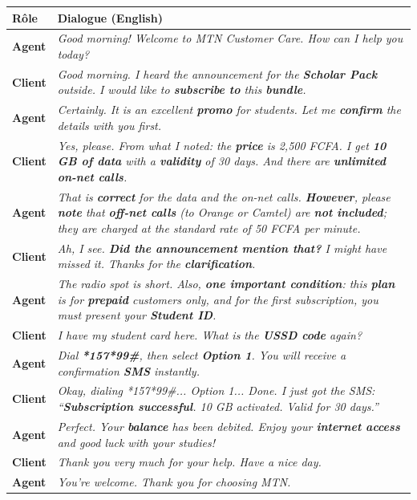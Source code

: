 \documentclass[11pt]{article}
\newcommand{\eng}[1]{\ifmmode\text{\textit{#1}}\else\begingroup\selectlanguage{english}\itshape #1\endgroup\fi}
\begin{document}
\begin{exoresolu}[Modèle de dialogue — Scénario 1 : MTN Scholar Pack (Élève A = Client / Élève B = Agent)]
\begin{tabularx}{\linewidth}{|l|X|}\hline
\rowcolor{popblueL} \textbf{Rôle} & \textbf{Dialogue (English)} \\ \hline
\textbf{Agent} & \eng{Good morning! Welcome to MTN Customer Care. How can I help you today?} \\ \hline
\textbf{Client} & \eng{Good morning. I heard the announcement for the \textbf{Scholar Pack} outside. I would like to \textbf{subscribe to} this \textbf{bundle}.} \\ \hline
\textbf{Agent} & \eng{Certainly. It is an excellent \textbf{promo} for students. Let me \textbf{confirm} the details with you first.} \\ \hline
\textbf{Client} & \eng{Yes, please. From what I noted: the \textbf{price} is 2,500 FCFA. I get \textbf{10 GB of data} with a \textbf{validity} of 30 days. And there are \textbf{unlimited on-net calls}.} \\ \hline
\textbf{Agent} & \eng{That is \textbf{correct} for the data and the on-net calls. \textbf{However}, please \textbf{note} that \textbf{off-net calls} (to Orange or Camtel) are \textbf{not included}; they are charged at the standard rate of 50 FCFA per minute.} \\ \hline
\textbf{Client} & \eng{Ah, I see. \textbf{Did the announcement mention that?} I might have missed it. Thanks for the \textbf{clarification}.} \\ \hline
\textbf{Agent} & \eng{The radio spot is short. Also, \textbf{one important condition}: this \textbf{plan} is for \textbf{prepaid} customers only, and for the first subscription, you must present your \textbf{Student ID}.} \\ \hline
\textbf{Client} & \eng{I have my student card here. What is the \textbf{USSD code} again?} \\ \hline
\textbf{Agent} & \eng{Dial \textbf{*157*99\#}, then select \textbf{Option 1}. You will receive a confirmation \textbf{SMS} instantly.} \\ \hline
\textbf{Client} & \eng{Okay, dialing *157*99\#... Option 1... Done. I just got the SMS: ``\textbf{Subscription successful}. 10 GB activated. Valid for 30 days.''} \\ \hline
\textbf{Agent} & \eng{Perfect. Your \textbf{balance} has been debited. Enjoy your \textbf{internet access} and good luck with your studies!} \\ \hline
\textbf{Client} & \eng{Thank you very much for your help. Have a nice day.} \\ \hline
\textbf{Agent} & \eng{You're welcome. Thank you for choosing MTN.} \\ \hline
\end{tabularx}


\end{exoresolu}
\end{document}
